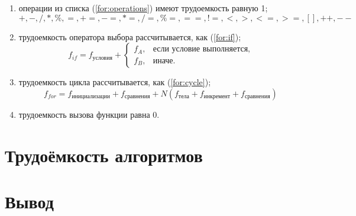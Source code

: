 \begin{enumerate}
	\item операции из списка (\ref{for:operations}) имеют трудоемкость равную 1;
	\begin{equation}
		\label{for:operations}
		+, -, /, *, \%, =, +=, -=, *=, /=, \%=, ==, !=, <, >, <=, >=, [], ++, {-}-
	\end{equation}
	\item трудоемкость оператора выбора  рассчитывается, как (\ref{for:if});
	\begin{equation}
		\label{for:if}
		f_{if} = f_{\text{условия}} +
		\begin{cases}
			f_A, & \text{если условие выполняется,}\\
			f_B, & \text{иначе.}
		\end{cases}
	\end{equation}
	\item трудоемкость цикла рассчитывается, как (\ref{for:cycle});
	\begin{equation}
		\label{for:cycle}
		f_{for} = f_{\text{инициализации}} + f_{\text{сравнения}} + N(f_{\text{тела}} + f_{\text{инкремент}} + f_{\text{сравнения}})
	\end{equation}
	\item трудоемкость вызова функции равна 0.
\end{enumerate}

\section{Трудоёмкость алгоритмов}

\section*{Вывод}